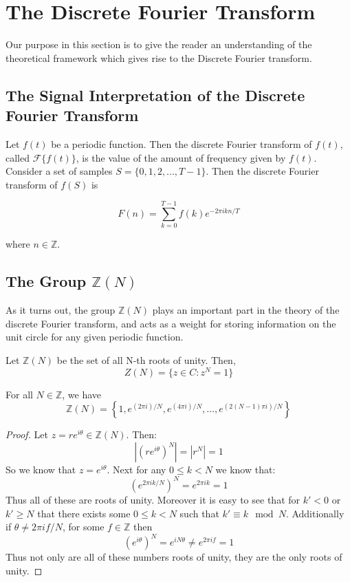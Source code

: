 \documentclass[../article.tex]{subfiles}
\begin{document}
\section{The Discrete Fourier Transform}
Our purpose in this section is to give the reader an understanding of the theoretical framework which gives rise to the Discrete Fourier transform.

\subsection{The Signal Interpretation of the Discrete Fourier Transform}

Let $f(t)$ be a periodic function. Then the discrete Fourier transform of $f(t)$, called $\mathcal{F}\{f(t)\}$, is the value of the amount of frequency given by $f(t)$. Consider a set of samples $S = \{0,1,2,...,T-1\}$. Then the discrete Fourier transform of $f(S)$ is

\[
F(n) = \sum_{k=0}^{T-1} f(k) e^{-2 \pi ikn/T}
\]

where $n \in \mathbb{Z}$.

\subsection{The Group $\mathbb{Z}(N)$}

As it turns out, the group $\mathbb{Z}(N)$ plays an important part in the theory of the discrete Fourier transform, and acts as a weight for storing information on the unit circle for any given periodic function.

\begin{definition}
Let $\mathbb{Z}(N)$ be the set of all N-th roots of unity. Then,
 \[Z(N) = \{z \in C : z^N = 1 \}\]
\end{definition}
\begin{theorem}
For all $N \in \mathbb{Z}$, we have
\[\mathbb{Z}(N)= \left\{1, e^{(2 \pi i)/N}, e^{(4 \pi i)/N}, \ldots, e^{(2(N-1) \pi i)/N}\right\}\]
\end{theorem}

\begin{proof}
    Let $z = re^{i\theta} \in \mathbb{Z}(N)$. Then:
    \[
        |(re^{i\theta})^N| = |r^N| = 1
    \]
    So we know that $z = e^{i\theta}$. Next for any 
    $0 \leq k < N$ we know that:
    \[
        (e^{2\pi ik/N})^N = e^{2\pi ik} = 1
    \]
    Thus all of these are roots of unity. Moreover it is 
    easy to see that for $k' < 0$ or $k' \geq N$ that there
    exists some $0 \leq k < N$ such that $k' \equiv k \mod N$.
    Additionally if $\theta \neq 2\pi if/N$, for some $f \in 
    \mathbb{Z}$ then
    \[
        (e^{i\theta})^N = e^{iN\theta} \neq e^{2\pi if} = 1
    \]
    Thus not only are all of these numbers roots of unity,
    they are the only roots of unity.
\end{proof}
\end{document}
